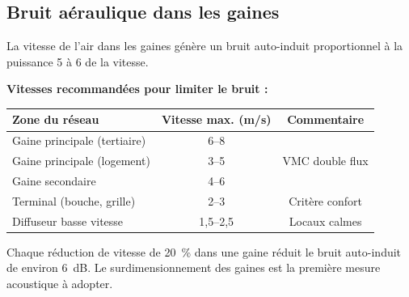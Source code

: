 \subsection{Bruit aéraulique dans les gaines}

La vitesse de l'air dans les gaines génère un bruit auto-induit proportionnel à la puissance 5 à 6 de la vitesse.

\begin{methode}
\textbf{Vitesses recommandées pour limiter le bruit :}

\begin{center}
\begin{tabular}{lcc}
\toprule
Zone du réseau & Vitesse max. (m/s) & Commentaire \\
\midrule
Gaine principale (tertiaire) & 6--8 & \\
Gaine principale (logement) & 3--5 & VMC double flux \\
Gaine secondaire & 4--6 & \\
Terminal (bouche, grille) & 2--3 & Critère confort \\
Diffuseur basse vitesse & 1,5--2,5 & Locaux calmes \\
\bottomrule
\end{tabular}
\end{center}
\end{methode}

\begin{attention}
Chaque réduction de vitesse de 20~\% dans une gaine réduit le bruit auto-induit de environ 6~dB. Le surdimensionnement des gaines est la première mesure acoustique à adopter.
\end{attention}

